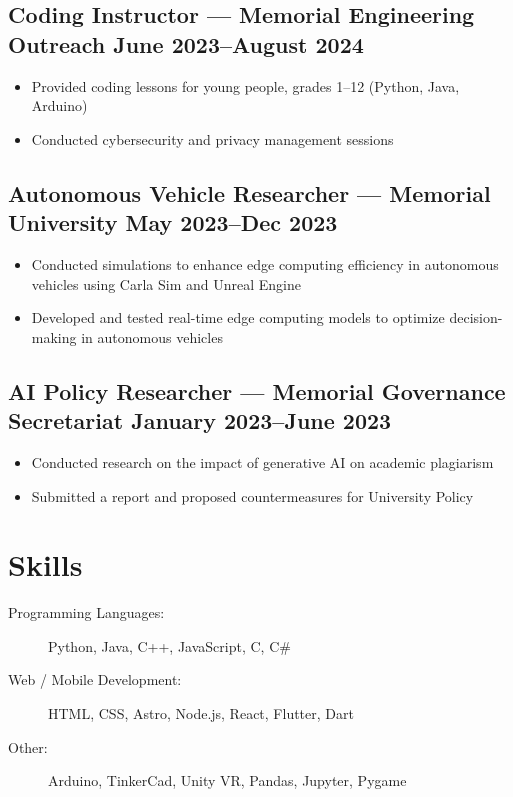 \documentclass[10pt]{article}
\begin{document}
\subsection{Coding Instructor — Memorial Engineering Outreach \hfill June 2023–August 2024}
\begin{itemize}
    \item Provided coding lessons for young people, grades 1–12 (Python, Java, Arduino)
    \item Conducted cybersecurity and privacy management sessions
\end{itemize}

\subsection{Autonomous Vehicle Researcher — Memorial University \hfill May 2023–Dec 2023}
\begin{itemize}
    \item Conducted simulations to enhance edge computing efficiency in autonomous vehicles using Carla Sim and Unreal Engine
    \item Developed and tested real-time edge computing models to optimize decision-making in autonomous vehicles
\end{itemize}

\subsection{AI Policy Researcher — Memorial Governance Secretariat \hfill January 2023–June 2023}
\begin{itemize}
    \item Conducted research on the impact of generative AI on academic plagiarism
    \item Submitted a report and proposed countermeasures for University Policy
\end{itemize}

\section{Skills}
\begin{description}
    \item[Programming Languages:] Python, Java, C++, JavaScript, C, C\#
    \item[Web / Mobile Development:] HTML, CSS, Astro, Node.js, React, Flutter, Dart
    \item[Other:] Arduino, TinkerCad, Unity VR, Pandas, Jupyter, Pygame
\end{description}
\end{document}
